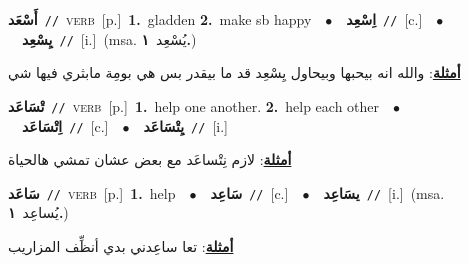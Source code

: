 \documentclass[10pt,a4paper,twoside]{article} %
\begin{document}
\begin{multicols}{2}
{\setlength\topsep{0pt}\textbf{\foreignlanguage{arabic}{أَسْعَد}}\ {\color{gray}\texttt{//}\color{black}}\ \textsc{verb}\ [p.]\ \textbf{1.}~gladden  \textbf{2.}~make sb happy\ \ $\bullet$\ \ \setlength\topsep{0pt}\textbf{\foreignlanguage{arabic}{اِسْعِد}}\ {\color{gray}\texttt{//}\color{black}}\ [c.]\ \ $\bullet$\ \ \setlength\topsep{0pt}\textbf{\foreignlanguage{arabic}{يِسْعِد}}\ {\color{gray}\texttt{//}\color{black}}\ [i.]\ \color{gray}(msa. \foreignlanguage{arabic}{يُسْعِد}~\foreignlanguage{arabic}{\textbf{١.}})\color{black}\  \begin{flushright}\color{gray}\foreignlanguage{arabic}{\textbf{\underline{\foreignlanguage{arabic}{أمثلة}}}: والله انه بيحبها وبيحاول يِسْعِد قد ما بيقدر بس هي بومِة مابثري فيها شي}\end{flushright}\color{black}} \vspace{2mm}

{\setlength\topsep{0pt}\textbf{\foreignlanguage{arabic}{تْسَاعَد}}\ {\color{gray}\texttt{//}\color{black}}\ \textsc{verb}\ [p.]\ \textbf{1.}~help one another.  \textbf{2.}~help each other\ \ $\bullet$\ \ \setlength\topsep{0pt}\textbf{\foreignlanguage{arabic}{اِتْسَاعَد}}\ {\color{gray}\texttt{//}\color{black}}\ [c.]\ \ $\bullet$\ \ \setlength\topsep{0pt}\textbf{\foreignlanguage{arabic}{يِتْسَاعَد}}\ {\color{gray}\texttt{//}\color{black}}\ [i.]\  \begin{flushright}\color{gray}\foreignlanguage{arabic}{\textbf{\underline{\foreignlanguage{arabic}{أمثلة}}}: لازم نِتْساعَد مع بعض عشان تمشي هالحياة}\end{flushright}\color{black}} \vspace{2mm}

{\setlength\topsep{0pt}\textbf{\foreignlanguage{arabic}{سَاعَد}}\ {\color{gray}\texttt{//}\color{black}}\ \textsc{verb}\ [p.]\ \textbf{1.}~help\ \ $\bullet$\ \ \setlength\topsep{0pt}\textbf{\foreignlanguage{arabic}{سَاعِد}}\ {\color{gray}\texttt{//}\color{black}}\ [c.]\ \ $\bullet$\ \ \setlength\topsep{0pt}\textbf{\foreignlanguage{arabic}{يسَاعِد}}\ {\color{gray}\texttt{//}\color{black}}\ [i.]\ \color{gray}(msa. \foreignlanguage{arabic}{يُساعِد}~\foreignlanguage{arabic}{\textbf{١.}})\color{black}\  \begin{flushright}\color{gray}\foreignlanguage{arabic}{\textbf{\underline{\foreignlanguage{arabic}{أمثلة}}}: تعا ساعِدني بدي أنظِّف المزاريب}\end{flushright}\color{black}} \vspace{2mm}


\end{multicols}
\end{document}
